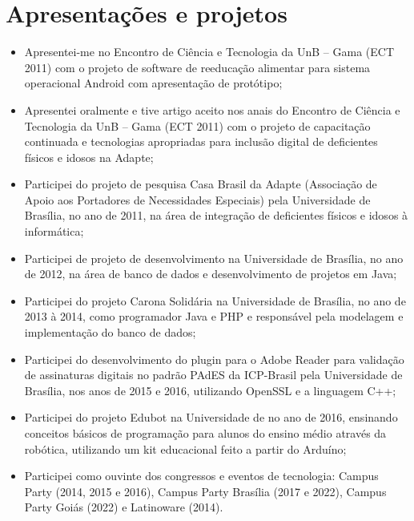 \section{Apresentações e projetos}

\begin{itemize}
    \item Apresentei-me no Encontro de Ciência e Tecnologia da UnB – Gama (ECT 2011) com o projeto de software de reeducação alimentar para sistema operacional Android com apresentação de protótipo;
    \item Apresentei oralmente e tive artigo aceito nos anais do Encontro de Ciência e Tecnologia da UnB – Gama (ECT 2011) com o projeto de capacitação continuada e tecnologias apropriadas para inclusão digital de deficientes físicos e idosos na Adapte;
    \item Participei do projeto de pesquisa Casa Brasil da Adapte (Associação de Apoio aos Portadores de Necessidades Especiais) pela Universidade de Brasília, no ano de 2011, na área de integração de deficientes físicos e idosos à informática;
    \item Participei de projeto de desenvolvimento na Universidade de Brasília, no ano de 2012, na área de banco de dados e desenvolvimento de projetos em Java;
    \item Participei do projeto Carona Solidária na Universidade de Brasília, no ano de 2013 à 2014, como programador Java e PHP e responsável pela modelagem e implementação do banco de dados;
    \item Participei do desenvolvimento do plugin para o Adobe Reader para validação de assinaturas digitais no padrão PAdES da ICP-Brasil pela Universidade de Brasília, nos anos de 2015 e 2016, utilizando OpenSSL e a linguagem C++;
    \item Participei do projeto Edubot na Universidade de no ano de 2016, ensinando conceitos básicos de programação para alunos do ensino médio através da robótica, utilizando um kit educacional feito a partir do Arduíno;
    \item Participei como ouvinte dos congressos e eventos de tecnologia: Campus Party (2014, 2015 e 2016), Campus Party Brasília (2017 e 2022), Campus Party Goiás (2022) e Latinoware (2014).
\end{itemize}